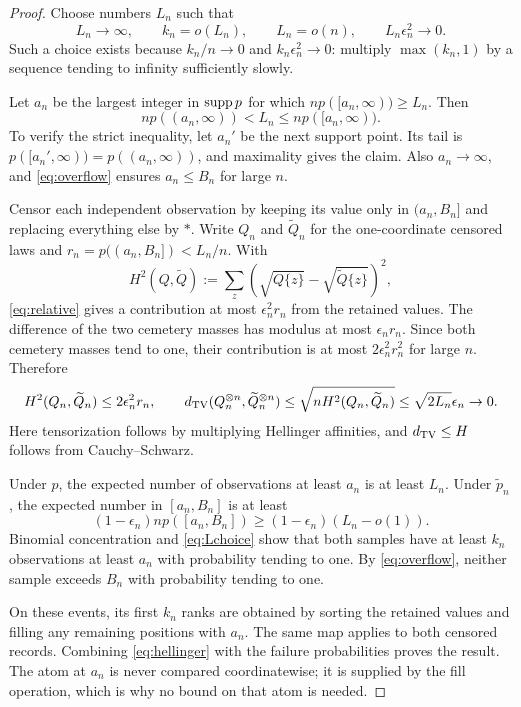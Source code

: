 \begin{proof}
Choose numbers $L_n$ such that
\begin{equation}\label{eq:Lchoice}
 L_n\to\infty,\qquad k_n=o(L_n),\qquad L_n=o(n),\qquad L_n\epsilon_n^2\to0.
\end{equation}
Such a choice exists because $k_n/n\to0$ and $k_n\epsilon_n^2\to0$: multiply $\max(k_n,1)$ by a sequence tending to infinity sufficiently slowly.

Let $a_n$ be the largest integer in $\operatorname{supp} p$ for which $np([a_n,\infty))\ge L_n$. Then
\begin{equation}\label{eq:thresholdmass}
 np((a_n,\infty))<L_n\le np([a_n,\infty)).
\end{equation}
To verify the strict inequality, let $a_n'$ be the next support point. Its tail is $p([a_n',\infty))=p((a_n,\infty))$, and maximality gives the claim. Also $a_n\to\infty$, and \eqref{eq:overflow} ensures $a_n\le B_n$ for large $n$.

Censor each independent observation by keeping its value only in $(a_n,B_n]$ and replacing everything else by $*$. Write $Q_n$ and $\widetilde Q_n$ for the one-coordinate censored laws and $r_n=p((a_n,B_n])<L_n/n$. With
\[
 H^2(Q,\widetilde Q):=\sum_z(\sqrt{Q\{z\}}-\sqrt{\widetilde Q\{z\}})^2,
\]
\eqref{eq:relative} gives a contribution at most $\epsilon_n^2r_n$ from the retained values. The difference of the two cemetery masses has modulus at most $\epsilon_nr_n$. Since both cemetery masses tend to one, their contribution is at most $2\epsilon_n^2r_n^2$ for large $n$. Therefore
\begin{equation}\label{eq:hellinger}
 H^2(Q_n,\widetilde Q_n)\le 2\epsilon_n^2r_n,
 \qquad
 d_{\mathrm{TV}}(Q_n^{\otimes n},\widetilde Q_n^{\otimes n})
 \le\sqrt{nH^2(Q_n,\widetilde Q_n)}
 \le\sqrt{2L_n}\epsilon_n\to0.
\end{equation}
Here tensorization follows by multiplying Hellinger affinities, and $d_{\mathrm{TV}}\le H$ follows from Cauchy--Schwarz.

Under $p$, the expected number of observations at least $a_n$ is at least $L_n$. Under $\widetilde p_n$, the expected number in $[a_n,B_n]$ is at least
\[
 (1-\epsilon_n)n p([a_n,B_n])\ge(1-\epsilon_n)(L_n-o(1)).
\]
Binomial concentration and \eqref{eq:Lchoice} show that both samples have at least $k_n$ observations at least $a_n$ with probability tending to one. By \eqref{eq:overflow}, neither sample exceeds $B_n$ with probability tending to one.

On these events, its first $k_n$ ranks are obtained by sorting the retained values and filling any remaining positions with $a_n$. The same map applies to both censored records. Combining \eqref{eq:hellinger} with the failure probabilities proves the result. The atom at $a_n$ is never compared coordinatewise; it is supplied by the fill operation, which is why no bound on that atom is needed.
\end{proof}

